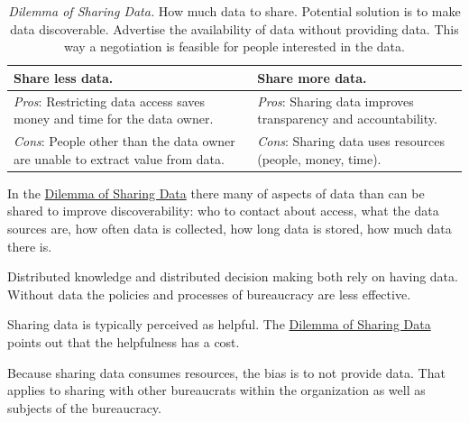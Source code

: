 \begin{center}
\begin{table}[H] %
\begin{tabular}{ | m{\dilemmatablewidth}| m{\dilemmatablewidth} | } 
  \hline
  \textbf{Share less data.} &
  \textbf{Share more data.} \\
  \hline
  \textit{Pros}: Restricting data access saves money and time for the data owner.&
  \textit{Pros}: Sharing data improves transparency and accountability. \\
  \hline
  \textit{Cons}: People other than the data owner are unable to extract value from data. & 
  \textit{Cons}: Sharing data uses resources (people, money, time). \\
  \hline
\end{tabular}
\caption{
\textit{Dilemma of Sharing Data.}
How much data to share. Potential solution is to make data discoverable. Advertise the availability of data without providing data. This way a negotiation is feasible for people interested in the data.
}
\label{table:dilemma-data-share-vs-hide}
\end{table}
\end{center}

In the \hyperref[table:dilemma-data-share-vs-hide]{Dilemma of Sharing Data} there many of aspects of data than can be shared to improve discoverability: who to contact about access, what the data sources are, how often data is collected, how long data is stored, how much data there is.

Distributed knowledge and distributed decision making both rely on having data. Without data the policies and processes of bureaucracy are less effective. 

Sharing data is typically perceived as helpful. 
The \hyperref[table:dilemma-data-share-vs-hide]{Dilemma of Sharing Data} points out that the helpfulness has a cost. 

Because sharing data consumes resources, the bias is to not provide data. That applies to sharing with other bureaucrats within the organization as well as subjects of the bureaucracy. 


